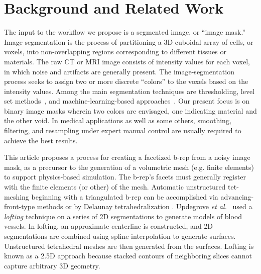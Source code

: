 \section{Background and Related Work}

The input to the workflow we propose is a segmented image, or ``image mask.''
Image segmentation is the process of partitioning a 3D cuboidal array of cells, or voxels, into non-overlapping regions corresponding to different tissues or materials.  The raw CT or MRI image consists of intensity values for each voxel, in which noise and artifacts are generally present.  The image-segmentation process seeks to assign two or more discrete ``colors'' to the voxels based on the intensity values.  Among the main segmentation techniques are thresholding, level set methods~\cite{malladi_1995, sethian_1996}, and machine-learning-based approaches~\cite{litjens_2017}.  Our present focus is on binary image masks wherein two colors are envisaged, one indicating material and the other void.  In medical applications as well as some others, smoothing, filtering, and resampling under expert manual control are usually required to achieve the best results.  

This article proposes a process for creating a facetized b-rep from a noisy image mask, as a precursor to the generation of a volumetric mesh (e.g. finite elements) to support physics-based simulation.  The b-rep's facets must generally register with the finite elements (or other) of the mesh.  Automatic unstructured tet-meshing beginning with a triangulated b-rep can be accomplished via advancing-front-type methods \cite{jin_1993, lohner_1988} or by Delaunay tetrahedralization \cite{lohner_1997}. Updegrove \textit{et al.}~\cite{updegrove_2016} used a \textit{lofting} technique on a series of 2D segmentations to generate models of blood vessels. In lofting, an approximate centerline is constructed, and 2D segmentations are combined using spline interpolation to generate surfaces. Unstructured tetrahedral meshes are then generated from the surfaces. Lofting is known as a 2.5D approach because stacked contours of neighboring slices cannot capture arbitrary 3D geometry. 
 
